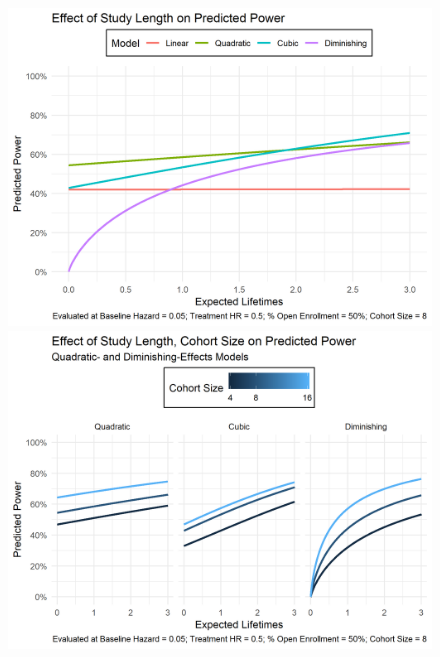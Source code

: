 \begin{figure}
\caption[Effect of Study Length on Power]{}
\label{fig:power-expected-lifetimes}
\includegraphics[width=\textwidth]{reports/figures/single-effects/power-expected-lifetimes.png}

\caption[Effect of Study Length, Cohort Size on Power]{}
\label{fig:power-expected-lifetimes-cohort-size}
\includegraphics[width=\textwidth]{reports/figures/multiple-effects/power-expected-lifetimes-cohort-size.png}
\end{figure}


